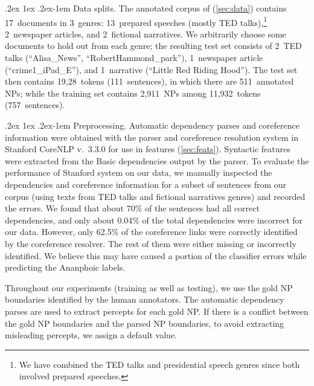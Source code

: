 \documentclass[11pt,letterpaper]{article}
\makeatletter
\renewcommand{\paragraph}{%
  \@startsection{paragraph}{4}%
  {\z@}{.2ex \@plus 1ex \@minus .2ex}{-1em}%
  {\normalfont\normalsize\bfseries}%
}
\makeatother
\begin{document}
\paragraph{Data splits.} The annotated corpus of \citet{bhatia14} (\cref{sec:data}) contains 17~documents 
in 3~genres: 13~prepared speeches (mostly TED talks),\footnote{We have combined the TED talks and presidential speech genres since both involved prepared speeches.} 2~newspaper articles, 
and 2~fictional narratives. We arbitrarily choose some documents to hold out from each genre; 
the resulting test set consists of 2~TED talks (``Alisa\_News'', ``RobertHammond\_park''), 
1~newspaper article (``crime1\_iPad\_E''), and 1~narrative (``Little Red Riding Hood'').
The test set then contains 19,28~tokens (111~sentences), in which there are 511~annotated NPs; 
while the training set contains 2,911~NPs among 11,932~tokens (757~sentences).

\paragraph{Preprocessing.} Automatic dependency parses and coreference information were obtained with 
the parser and coreference resolution system in Stanford CoreNLP v.~3.3.0 \citep{socher-13,recasens-13}
for use in features (\cref{sec:feats}). Syntactic features were extracted from the Basic dependencies output by the parser. 
To evaluate the performance of Stanford system on our data, 
we manually inspected the dependencies and coreference information for a subset of sentences from our corpus (using texts from TED talks and fictional narratives genres) 
and recorded the errors. 
We found that about 70\% of the sentences had all correct dependencies, and only about 0.04\% of the total dependencies were incorrect for our data. However, only 62.5\% of the coreference links were correctly identified by the coreference resolver. The rest of them were either missing or incorrectly identified. We believe this may have caused a portion of the classifier errors while predicting the Ananphoic labels.

Throughout our experiments (training as well as testing), we use the gold NP boundaries identified by the human annotators.
The automatic dependency parses are used to extract percepts for each gold NP.     
If there is a conflict between the gold NP boundaries and the parsed NP boundaries, to avoid extracting misleading percepts, 
we assign a default value.  
\end{document}
